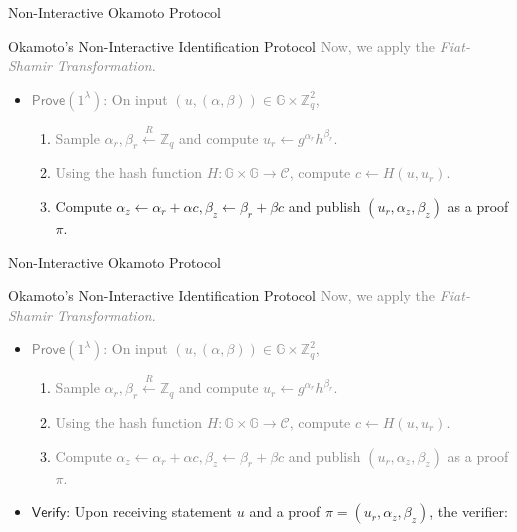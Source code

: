 \documentclass[xcolor={usenames,dvipsnames}]{beamer}
\begin{document}
    \begin{frame}{Non-Interactive Okamoto Protocol}
        \begin{block}{Okamoto's Non-Interactive Identification Protocol}
            \textcolor{gray}{Now, we apply the \textit{Fiat-Shamir Transformation}.}
            \begin{itemize}
                \item \textcolor{gray}{$\mathsf{Prove}(1^{\lambda})$: On input $(u,(\alpha,\beta)) \in \mathbb{G} \times \mathbb{Z}_q^2$, }
                \begin{enumerate}
                    \item \textcolor{gray}{Sample $\alpha_r,\beta_r \xleftarrow{R} \mathbb{Z}_q$ and compute $u_r \gets g^{\alpha_r}h^{\beta_r}$.}
                    \item \textcolor{gray}{Using the hash function $H: \mathbb{G} \times \mathbb{G} \to \mathcal{C}$, compute $c \gets H(u,u_r)$.}
                    \item \textcolor{blue!80!black}{Compute $\alpha_z \gets \alpha_r + \alpha c, \beta_z \gets \beta_r + \beta c$ and publish $(u_r,\alpha_z,\beta_z)$ as a proof $\pi$.}
                \end{enumerate}
            \end{itemize}
        \end{block}
    \end{frame}

    \begin{frame}{Non-Interactive Okamoto Protocol}
        \begin{block}{Okamoto's Non-Interactive Identification Protocol}
            \textcolor{gray}{Now, we apply the \textit{Fiat-Shamir Transformation}.}
            \begin{itemize}
                \item \textcolor{gray}{$\mathsf{Prove}(1^{\lambda})$: On input $(u,(\alpha,\beta)) \in \mathbb{G} \times \mathbb{Z}_q^2$, }
                \begin{enumerate}
                    \item \textcolor{gray}{Sample $\alpha_r,\beta_r \xleftarrow{R} \mathbb{Z}_q$ and compute $u_r \gets g^{\alpha_r}h^{\beta_r}$.}
                    \item \textcolor{gray}{Using the hash function $H: \mathbb{G} \times \mathbb{G} \to \mathcal{C}$, compute $c \gets H(u,u_r)$.}
                    \item \textcolor{gray}{Compute $\alpha_z \gets \alpha_r + \alpha c, \beta_z \gets \beta_r + \beta c$ and publish $(u_r,\alpha_z,\beta_z)$ as a proof $\pi$.}
                \end{enumerate}
                \item \textcolor{blue!80!black}{$\mathsf{Verify}$: Upon receiving statement $u$ and a proof $\pi=(u_r,\alpha_z,\beta_z)$, the verifier:}
            \end{itemize}
        \end{block}
    \end{frame}
\end{document}
